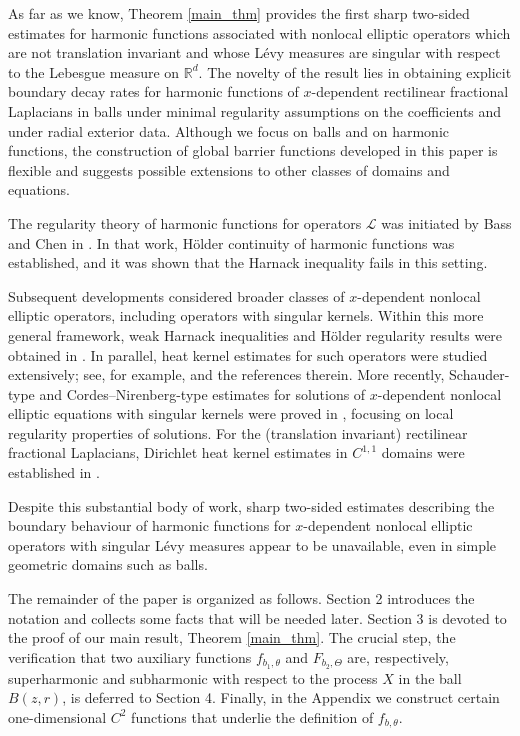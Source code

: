 \documentclass[a4paper,12pt,reqno]{amsart}
\theoremstyle{definition}
\theoremstyle{remark}
\newcommand{\calL}{\mathcal{L}}
\newcommand{\R}{\mathds{R}}
\begin{document}
As far as we know, Theorem \ref{main_thm} provides the first sharp two-sided estimates for harmonic functions associated with nonlocal elliptic operators which are not translation invariant and whose Lévy measures are singular with respect to the Lebesgue measure on $\R^d$. The novelty of the result lies in obtaining explicit boundary decay rates for harmonic functions of $x$-dependent rectilinear fractional Laplacians in balls under minimal regularity assumptions on the coefficients and under radial exterior data.
Although we focus on balls and on harmonic functions, the construction of global barrier functions developed in this paper is flexible and suggests possible extensions to other classes of domains and equations. 

The regularity theory of harmonic functions for operators $\calL$ was initiated by Bass and Chen in \cite{BC2010}. In that work, H\"older continuity of harmonic functions was established, and it was shown that the Harnack inequality fails in this setting.

Subsequent developments considered broader classes of $x$-dependent nonlocal elliptic operators, including operators with singular kernels. Within this more general framework, weak Harnack inequalities and H\"older regularity results were obtained in \cite{CK2020, DK2020}. In parallel, heat kernel estimates for such operators were studied extensively; see, for example, \cite{KSV2018, KKS2021, KKR2022, KKK2022, KKR2024} and the references therein. More recently, Schauder-type and Cordes--Nirenberg-type estimates for solutions of $x$-dependent nonlocal elliptic equations with singular kernels were proved in \cite{FR2024}, focusing on local regularity properties of solutions. For the (translation invariant) rectilinear fractional Laplacians, Dirichlet heat kernel estimates in $C^{1,1}$ domains were established in \cite{CHZ2025}.

Despite this substantial body of work, sharp two-sided estimates describing the boundary behaviour of harmonic functions for $x$-dependent nonlocal elliptic operators with singular L\'evy measures appear to be unavailable, even in simple geometric domains such as balls.

The remainder of the paper is organized as follows.
Section 2 introduces the notation and collects some facts that will be needed later. Section 3 is devoted to the proof of our main result, Theorem \ref{main_thm}. The crucial step, the verification that two auxiliary functions $f_{b_1,\theta}$ and $F_{b_2,\Theta}$ are, respectively, superharmonic and subharmonic with respect to the process $X$ in the ball $B(z,r)$, is deferred to Section 4. Finally, in the Appendix we construct certain one-dimensional $C^2$ functions that underlie the definition of $f_{b,\theta}$.
\end{document}
